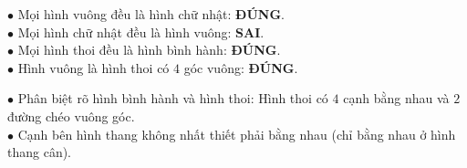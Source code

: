 \documentclass[14pt,a4paper,oneside]{extbook}
\begin{document}
\noindent
\begin{minipage}[t]{0.54\textwidth}
  \begin{tcolorbox}[
    enhanced,
    title={\footnotesize\bfseries\color{white}\faLightbulbO\ Các câu khẳng định đúng - sai kinh điển},
    colback=green!3!white,
    colframe=green!60!black,
    arc=2.5mm, boxrule=0.8pt, top=1.8mm, bottom=1.8mm, left=2.2mm, right=2.2mm
  ]
    \footnotesize
    $\bullet$ Mọi hình vuông đều là hình chữ nhật: \textbf{ĐÚNG}.\\
    $\bullet$ Mọi hình chữ nhật đều là hình vuông: \textbf{SAI}.\\
    $\bullet$ Mọi hình thoi đều là hình bình hành: \textbf{ĐÚNG}.\\
    $\bullet$ Hình vuông là hình thoi có $4$ góc vuông: \textbf{ĐÚNG}.
  \end{tcolorbox}
\end{minipage}%
\hfill
\begin{minipage}[t]{0.44\textwidth}
  \begin{tcolorbox}[
    enhanced,
    title={\footnotesize\bfseries\color{white}\faExclamationTriangle\ Mẹo tránh bẫy trắc nghiệm},
    colback=red!2!white,
    colframe=red!70!black,
    arc=2.5mm, boxrule=0.8pt, top=1.8mm, bottom=1.8mm, left=2.2mm, right=2.2mm
  ]
    \footnotesize
    $\bullet$ Phân biệt rõ hình bình hành và hình thoi: Hình thoi có $4$ cạnh bằng nhau và $2$ đường chéo vuông góc.\\
    $\bullet$ Cạnh bên hình thang không nhất thiết phải bằng nhau (chỉ bằng nhau ở hình thang cân).
  \end{tcolorbox}
\end{minipage}
\end{document}
